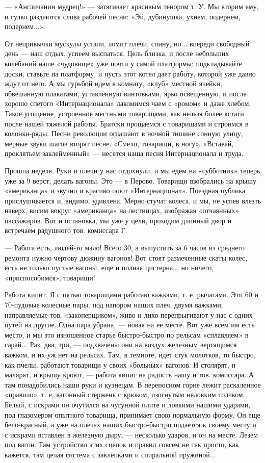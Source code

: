 \documentclass[12pt]{article}
\newcommand{\parnum}{(\arabic{parcount})}
\newcounter{parcount}
\newenvironment{parnumbers}{%
  \par%
  \everypar{\noindent \stepcounter{parcount}\marginpar[]{\parnum}}%
}{}
\begin{document}
\begin{parnumbers}
— «Англичанин мудрец!» — затягивает красивым тенором т. У. Мы вторим ему, и гулко раздаются слова рабочей песни: «Эй, дубинушка, ухнем, подернем, подернем...».

От непривычки мускулы устали, ломит плечи, спину, но... впереди свободный день — наш отдых, успеем выспаться. Цель близка, и после небольших колебаний наше «чудовище» уже почти у самой платформы: подкладывайте доски, ставьте на платформу, и пусть этот котел дает работу, которой уже давно ждут от него. А мы гурьбой идем в комнату, «клуб» местной ячейки, обвешанную плакатами, уставленную винтовками, ярко освещенную, и после хорошо спетого «Интернационала» лакомимся чаем с «ромом» и даже хлебом. Такое угощение, устроенное местными товарищами, как нельзя более кстати после нашей тяжелой работы. Братски прощаемся с товарищами и строимся в колонки-ряды. Песни революции оглашают в ночной тишине сонную улицу, мерные звуки шагов вторят песне. «Смело, товарищи, в ногу». «Вставай, проклятьем заклейменный» — несется наша песня Интернационала и труда.

Прошла неделя. Руки и плечи у нас отдохнули, и мы едем на «субботник» теперь уже за 9 верст, делать вагоны. Это — в Перово. Товарищи взобрались на крышу «американца» и звучно и красиво поют «Интернационал». Поездная публика прислушивается и, видимо, удивлена. Мерно стучат колеса, и мы, не успев влезть наверх, висим вокруг «американца» на лестницах, изображая «отчаянных» пассажиров. Вот и остановка, мы уже у цели, проходим длинный двор и встречаем радушного тов. комиссара Г.

— Работа есть, людей-то мало! Всего 30, а выпустить за 6 часов из среднего ремонта нужно чертову дюжину вагонов! Вот стоят размеченные скаты колес, есть не только пустые вагоны, еще и полная цистерна... но ничего, «приспособимся», товарищи!

Работа кипит. Я с пятью товарищами работаю важками, т. е. рычагами. Эти 60 и 70-пудовые колесные пары, под напором наших плеч, двумя важками, направляемые тов. «закоперщиком», живо и лихо перепрыгивают у нас с одних путей на другие. Одна пара убрана, — новая на ее месте. Вот уже всем им есть место, и мы это изношенное старье быстро-быстро по рельсам «сплавляем» в сарай... Раз, два, три, — подхвачены они на воздух железным вертящимся важком, и их уж нет на рельсах. Там, в темноте, идет стук молотков, то быстро, как пчелы, работают товарищи у своих «больных» вагонов. И столярят, и малярят, и крышу кроют, — работа кипит на радость нашу и тов. комиссара. А там понадобились наши руки и кузнецам. В переносном горне лежит раскаленное «правило», т. е. вагонный стержень с крюком, изогнутым неловким толчком. Белый, с искрами он очутился на чугунной плите и ловкими нашими ударами, под глазомером опытного товарища, принимает свою нормальную форму. Он еще бело-красный, а уже на плечах наших быстро-быстро подается к своему месту и с искрами вставлен в железную дыру, — несколько ударов, и он на месте. Лезем под вагон. Там устройство этих сцепок и правил совсем не так просто, как кажется, там целая система с заклепками и спиральной пружиной...


\end{parnumbers}
\end{document}
